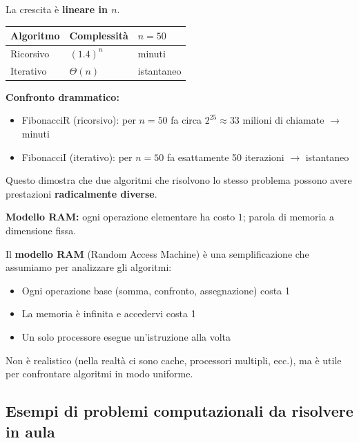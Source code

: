 La crescita è \textbf{lineare in $n$}.


\begin{center}
	\begin{tabular}{lll}
		\toprule
		Algoritmo & Complessità & $n=50$ \\
		\midrule
		Ricorsivo & $(1.4)^n$   & minuti \\
		Iterativo & $\Theta(n)$ & istantaneo \\
		\bottomrule
	\end{tabular}
\end{center}

\begin{hardnote}
	\textbf{Confronto drammatico:}
	\begin{itemize}
		\item FibonacciR (ricorsivo): per $n=50$ fa circa $2^{25} \approx 33$ milioni di chiamate $\to$ minuti
		\item FibonacciI (iterativo): per $n=50$ fa esattamente 50 iterazioni $\to$ istantaneo
	\end{itemize}
	
	Questo dimostra che due algoritmi che risolvono lo stesso problema possono avere prestazioni \textbf{radicalmente diverse}.
\end{hardnote}

\noindent\textbf{Modello RAM:} ogni operazione elementare ha costo $1$;
parola di memoria a dimensione fissa.

\begin{nota}
	Il \textbf{modello RAM} (Random Access Machine) è una semplificazione che assumiamo per analizzare gli algoritmi:
	\begin{itemize}
		\item Ogni operazione base (somma, confronto, assegnazione) costa 1
		\item La memoria è infinita e accedervi costa 1
		\item Un solo processore esegue un'istruzione alla volta
	\end{itemize}
	
	Non è realistico (nella realtà ci sono cache, processori multipli, ecc.), ma è utile per confrontare algoritmi in modo uniforme.
\end{nota}

\subsection{Esempi di problemi computazionali da risolvere in aula}

